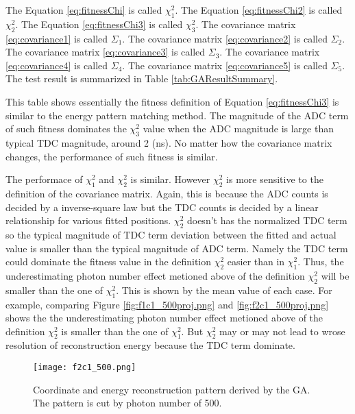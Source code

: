 The Equation \ref{eq:fitnessChi} is called $\chi^2_1$.
The Equation \ref{eq:fitnessChi2} is called $\chi^2_2$.
The Equation \ref{eq:fitnessChi3} is called $\chi^2_3$.
The covariance matrix \ref{eq:covariance1} is called $\Sigma_1$.
The covariance matrix \ref{eq:covariance2} is called $\Sigma_2$.
The covariance matrix \ref{eq:covariance3} is called $\Sigma_3$.
The covariance matrix \ref{eq:covariance4} is called $\Sigma_4$.
The covariance matrix \ref{eq:covariance5} is called $\Sigma_5$.
The test result is summarized in Table \ref{tab:GAResultSummary}.

This table shows essentially the fitness definition of Equation \ref{eq:fitnessChi3}
is similar to the energy pattern matching method. The magnitude of the ADC term
of such fitness dominates the $\chi^2_3$ value when the ADC magnitude is large than
typical TDC magnitude, around 2 (ns). No matter how the covariance matrix changes,
the performance of such fitness is similar.

The performace of $\chi^2_1$ and $\chi^2_2$ is similar. However $\chi^2_2$ is
more sensitive to the definition of the covariance matrix.
Again, this is because the ADC counts is decided by a inverse-square law but
the TDC counts is decided by a linear relationship for various fitted positions.
$\chi^2_2$ doesn't has the normalized TDC term so the typical magnitude of TDC term
deviation between the fitted and actual value is smaller than the typical magnitude of ADC term.
Namely the TDC term could dominate the fitness value in the definition $\chi^2_2$ easier than in $\chi^2_1$.
Thus, the underestimating photon number effect metioned above of the definition $\chi^2_2$ will be smaller than the one of $\chi^2_1$.
This is shown by the mean value of each case.
For example, comparing Figure \ref{fig:f1c1_500proj.png} and \ref{fig:f2c1_500proj.png} shows the
the underestimating photon number effect metioned above of the definition $\chi^2_2$ is smaller than the one of $\chi^2_1$.
But $\chi^2_2$ may or may not lead to wrose resolution of reconstruction energy because the TDC term dominate.


\begin{figure}
    \centering
    \texttt{[image: f2c1\_500.png]}
    \caption[Coordinate and energy reconstruction]
{
Coordinate and energy reconstruction pattern derived by the GA.
The pattern is cut by photon number of 500.
}
    \label{fig:f2c1_500.png}
    \end{figure}



